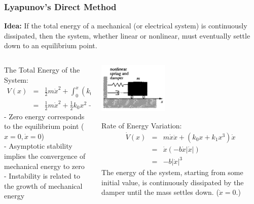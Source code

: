 \documentclass[11pt,handout]{beamer}   %
\begin{document}
\begin{frame}
\frametitle{Lyapunov's Direct Method}
\small
\textbf{Idea:} If the total energy of a mechanical (or electrical system) is continuously dissipated, then the system, whether linear or nonlinear, must eventually settle down to an equilibrium point.\\
\vspace{6pt}
\begin{columns}
\begin{column}{0.5\textwidth}
The Total Energy of the System:
\begin{eqnarray*}
V(x) &=& \frac{1}{2} m \dot{x}^2 + \int_0^x (k_0 x + k_1 x^3) dx\\
&=& \frac{1}{2}m\dot{x}^2 + \frac{1}{2}k_0 x^2 + \frac{1}{4} k_1 x^4
\end{eqnarray*}
- Zero energy corresponds to the equilibrium point ($x = 0, \dot{x} = 0$)\\
- Asymptotic stability implies the convergence of mechanical energy to zero\\
- Instability is related to the growth of mechanical energy\\
\end{column}
\begin{column}{0.5\textwidth}
\begin{center}
\includegraphics[width = 0.4\textwidth]{Figures/Fig36.PNG}
\end{center}
Rate of Energy Variation:
\begin{eqnarray*}
\dot{V}(x) &=& m \dot{x} \ddot{x} + (k_0 x + k_1 x^3)\dot{x}\\
&=& \dot{x}(-b\dot{x}|\dot{x}|)\\
&=& -b |\dot{x}|^3
\end{eqnarray*}
 The energy of the system, starting from some initial value, is continuously dissipated by the damper until the mass settles down. ($\dot{x}=0$.)
\end{column}
\end{columns}
\end{frame}
\end{document}
